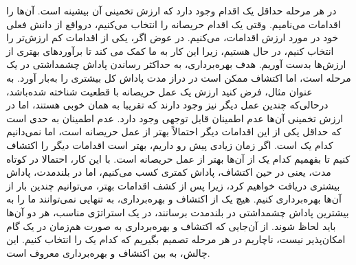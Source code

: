 در هر مرحله حداقل یک اقدام وجود دارد
که ارزش تخمینی آن بیشینه است. آن‌ها را اقدامات  می‌نامیم. وقتی یک اقدام حریصانه را انتخاب می‌کنیم،
درواقع از دانش فعلی خود در مورد ارزش اقدامات،  می‌کنیم. در عوض اگر،
یکی از اقدامات کم ارزش‌تر را انتخاب کنیم، در حال  هستیم، زیرا این کار به ما کمک می ‌کند تا برآوردهای بهتری از ارزش‌ها بدست آوریم. هدف بهره‌برداری، به حداکثر رساندن پاداش چشمداشتی در یک مرحله است، اما اکتشاف ممکن است در دراز مدت پاداش کل بیشتری را به‌بار‌ آورد.
به عنوان مثال، فرض کنید ارزش یک عمل حریصانه با قطعیت شناخته شده‌باشد، در‌حالی‌‌که چندین عمل دیگر نیز وجود دارند که
تقریبا به همان خوبی  هستند، اما در ارزش تخمینی آن‌ها عدم اطمینان قابل توجهی  وجود دارد. عدم اطمینان به حدی است که حداقل
یکی از این اقدامات دیگر احتمالاً بهتر از عمل حریصانه است، اما نمی‌دانیم کدام یک است.
اگر زمان زیادی پیش رو داریم، بهتر است
اقدامات دیگر را اکتشاف کنیم تا بفهمیم کدام یک از آن‌ها بهتر از عمل حریصانه است. با این کار، احتمالا در کوتاه مدت، یعنی در حین اکتشاف، پاداش کمتری کسب می‌کنیم، اما در بلندمدت، پاداش بیشتری دریافت خواهیم کرد، زیرا پس از کشف اقدامات بهتر، می‌توانیم چندین بار از آن‌ها بهره‌برداری کنیم. 
هیچ یک از اکتشاف و بهره‌برداری، به تنهایی نمی‌توانند ما را به بیشترین پاداش چشمداشتی در بلندمدت برسانند، در یک استراتژی مناسب، هر دو آن‌ها باید لحاظ شوند. از آن‌جایی که اکتشاف و بهره‌برداری به صورت هم‌زمان در یک گام امکان‌پذیر نیست، ناچاریم در هر مرحله تصمیم بگیریم که کدام یک را انتخاب کنیم. این چالش، به  بین اکتشاف و بهره‌برداری معروف است.

